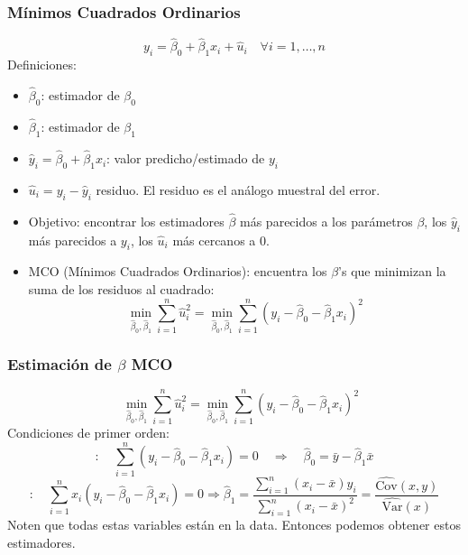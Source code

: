 \documentclass{beamer}
\begin{document}
\begin{frame}
	\frametitle{Mínimos Cuadrados Ordinarios}  %
\[ {y}_i = \hat{\beta}_0 + \hat{\beta}_1 x_i + \hat{u}_i \quad \forall i = 1, \ldots, n \]
Definiciones:
\begin{itemize}
 \item $\hat{\beta}_0$: estimador de $\beta_0$
    \item $\hat{\beta}_1$: estimador de $\beta_1$
    \item $\hat{y}_i = \hat{\beta}_0 + \hat{\beta}_1 x_i$: valor predicho/estimado de $y_i$
    \item $\hat{u}_i = y_i - \hat{y}_i$ residuo. El residuo es el análogo muestral del error.
\end{itemize}
\begin{itemize}
    \item Objetivo: encontrar los estimadores \(\hat{\beta}\) más parecidos a los parámetros \(\beta\), los \(\hat{y}_i\) más parecidos a \(y_i\), los \(\hat{u}_i\) más cercanos a 0.\\
    \item MCO (Mínimos Cuadrados Ordinarios): encuentra los \(\beta\)'s que minimizan la suma de los residuos al cuadrado:
\[ \min_{\hat{\beta}_0, \hat{\beta}_1} \sum_{i=1}^{n} \hat{u}_i^2 = \min_{\hat{\beta}_0, \hat{\beta}_1} \sum_{i=1}^{n} (y_i - \hat{\beta}_0 - \hat{\beta}_1 x_i)^2 \]
\end{itemize}
\end{frame}	
\begin{frame}
	\frametitle{Estimaci\'on de $\beta$ MCO} %
\begin{equation*}
\quad \min_{\hat{\beta}_0, \hat{\beta}_1} \sum_{i=1}^{n} \hat{u}_i^2 = \min_{\hat{\beta}_0, \hat{\beta}_1} \sum_{i=1}^{n} (y_i - \hat{\beta}_0 - \hat{\beta}_1 x_i)^2
\end{equation*}
Condiciones de primer orden:
{\small
\begin{equation*}
[\hat{\beta}_0] : \quad \sum_{i=1}^{n} (y_i - \hat{\beta}_0 - \hat{\beta}_1 x_i) = 0 \quad \Rightarrow \quad \hat{\beta}_0 = \bar{y} - \hat{\beta}_1 \bar{x} 
\end{equation*}
\begin{equation*}
[\hat{\beta}_1] : \quad \sum_{i=1}^{n} x_i(y_i - \hat{\beta}_0 - \hat{\beta}_1 x_i) = 0 \Rightarrow \hat{\beta}_1 = \frac{\sum_{i=1}^{n}(x_i - \bar{x})y_i}{\sum_{i=1}^{n}(x_i - \bar{x})^2} = \frac{\widehat{\text{Cov}}(x, y)}{\widehat{\text{Var}}(x)}
\end{equation*}}
Noten que todas estas variables están en la data. Entonces podemos obtener estos estimadores.
\end{frame}
\end{document}
